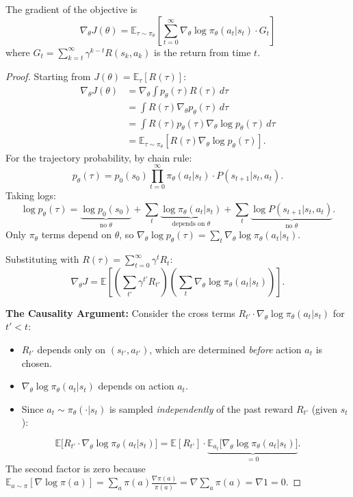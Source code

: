 \begin{theorem}
    The gradient of the objective is
    \[
        \nabla_\theta J(\theta) = \mathbb{E}_{\tau \sim \pi_\theta} \left[ \sum_{t=0}^{\infty} \nabla_\theta \log \pi_\theta(a_t | s_t) \cdot G_t \right]
    \]
    where $G_t = \sum_{k=t}^{\infty} \gamma^{k-t} R(s_k, a_k)$ is the return from time $t$.
\end{theorem}

\begin{proof}
    Starting from $J(\theta) = \mathbb{E}_{\tau}[R(\tau)]$:
    \begin{align*}
        \nabla_\theta J(\theta) & = \nabla_\theta \int p_\theta(\tau) R(\tau) \, d\tau                                          \\
                                & = \int R(\tau) \nabla_\theta p_\theta(\tau) \, d\tau                                          \\
                                & = \int R(\tau) p_\theta(\tau) \nabla_\theta \log p_\theta(\tau) \, d\tau                      \\
                                & = \mathbb{E}_{\tau \sim \pi_\theta} \left[ R(\tau) \nabla_\theta \log p_\theta(\tau) \right].
    \end{align*}
    For the trajectory probability, by chain rule:
    \[
        p_\theta(\tau) = p_0(s_0) \prod_{t=0}^{\infty} \pi_\theta(a_t|s_t) \cdot P(s_{t+1}|s_t,a_t).
    \]
    Taking logs:
    \[
        \log p_\theta(\tau) = \underbrace{\log p_0(s_0)}_{\text{no } \theta} + \sum_t \underbrace{\log \pi_\theta(a_t|s_t)}_{\text{depends on } \theta} + \sum_t \underbrace{\log P(s_{t+1}|s_t,a_t)}_{\text{no } \theta}.
    \]
    Only $\pi_\theta$ terms depend on $\theta$, so $\nabla_\theta \log p_\theta(\tau) = \sum_{t} \nabla_\theta \log \pi_\theta(a_t | s_t)$.

    Substituting with $R(\tau) = \sum_{t=0}^{\infty} \gamma^t R_t$:
    \[
        \nabla_\theta J = \mathbb{E}\left[ \left(\sum_{t'} \gamma^{t'} R_{t'}\right) \left(\sum_t \nabla_\theta \log \pi_\theta(a_t|s_t)\right) \right].
    \]

    \textbf{The Causality Argument:} Consider the cross terms $R_{t'} \cdot \nabla_\theta \log \pi_\theta(a_t|s_t)$ for $t' < t$:
    \begin{itemize}
        \item $R_{t'}$ depends only on $(s_{t'}, a_{t'})$, which are determined \emph{before} action $a_t$ is chosen.
        \item $\nabla_\theta \log \pi_\theta(a_t|s_t)$ depends on action $a_t$.
        \item Since $a_t \sim \pi_\theta(\cdot|s_t)$ is sampled \emph{independently} of the past reward $R_{t'}$ (given $s_t$):
    \end{itemize}
    \[
        \mathbb{E}\bigl[R_{t'} \cdot \nabla_\theta \log \pi_\theta(a_t|s_t)\bigr] = \mathbb{E}[R_{t'}] \cdot \underbrace{\mathbb{E}_{a_t}\bigl[\nabla_\theta \log \pi_\theta(a_t|s_t)\bigr]}_{= 0}.
    \]
    The second factor is zero because $\mathbb{E}_{a \sim \pi}[\nabla \log \pi(a)] = \sum_a \pi(a) \frac{\nabla \pi(a)}{\pi(a)} = \nabla \sum_a \pi(a) = \nabla 1 = 0$.


\end{proof}
